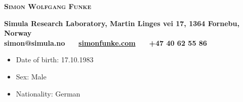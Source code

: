 \documentclass[11pt]{article}
\newcommand{\makeheading}[1]%
        {\hspace*{-\marginparsep minus \marginparwidth}%
         \begin{minipage}[t]{\textwidth+\marginparwidth+\marginparsep}%
                {\begin{center} \LARGE \bfseries\textsc{ #1} \end{center}}%
        \end{minipage}}
\newcommand{\address}[4]%
        {\hspace*{-\marginparsep minus \marginparwidth}%
         \begin{minipage}[t]{\textwidth+\marginparwidth+\marginparsep}%
         {\begin{center} \vspace{0.25cm} \textnormal \bfseries #1 \\ #2 ~~ #4 ~~ #3 \end{center}}%
        \end{minipage}}
\begin{document}
\makeheading{Simon Wolfgang Funke}
\address{Simula Research Laboratory, Martin Linges vei 17, 1364 Fornebu, Norway}{simon@simula.no}{+47 40 62 55 86}{\href{http://www.simonfunke.com}{simonfunke.com}}

\newlength{\rcollength}\setlength{\rcollength}{1.0in}%


\begin{itemize}
    \vspace{-0.2cm}
\item[] Date of birth: 17.10.1983
    \vspace{-0.2cm}
\item[] Sex: Male
    \vspace{-0.2cm}
\item[] Nationality: German
    \vspace{-0.2cm}
\end{itemize}
\end{document}

